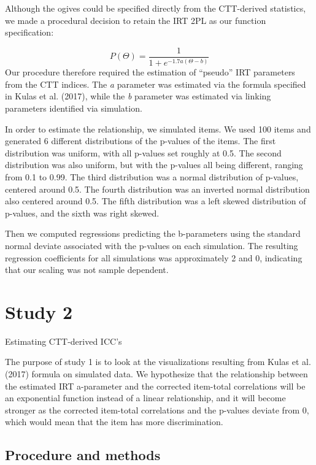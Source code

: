 \documentclass[
  man]{apa6}
\begin{document}
Although the ogives could be specified directly from the CTT-derived statistics, we made a procedural decision to retain the IRT 2PL as our function specification:

\[P(\Theta)=\frac{1}{1+e^{-1.7a(\Theta-b)}}\]
Our procedure therefore required the estimation of ``pseudo'' IRT parameters from the CTT indices. The \emph{a} parameter was estimated via the formula specified in Kulas et al. (2017), while the \emph{b} parameter was estimated via linking parameters identified via simulation.

In order to estimate the relationship, we simulated items. We used 100 items and generated 6 different distributions of the p-values of the items. The first distribution was uniform, with all p-values set roughly at 0.5. The second distribution was also uniform, but with the p-values all being different, ranging from 0.1 to 0.99. The third distribution was a normal distribution of p-values, centered around 0.5. The fourth distribution was an inverted normal distribution also centered around 0.5. The fifth distribution was a left skewed distribution of p-values, and the sixth was right skewed.

Then we computed regressions predicting the b-parameters using the standard normal deviate associated with the p-values on each simulation. The resulting regression coefficients for all simulations was approximately 2 and 0, indicating that our scaling was not sample dependent.

\hypertarget{study-2}{%
\section{Study 2}\label{study-2}}

Estimating CTT-derived ICC's

The purpose of study 1 is to look at the visualizations resulting from Kulas et al. (2017) formula on simulated data. We hypothesize that the relationship between the estimated IRT a-parameter and the corrected item-total correlations will be an exponential function instead of a linear relationship, and it will become stronger as the corrected item-total correlations and the p-values deviate from 0, which would mean that the item has more discrimination.

\hypertarget{procedure-and-methods}{%
\subsection{Procedure and methods}\label{procedure-and-methods}}
\end{document}
